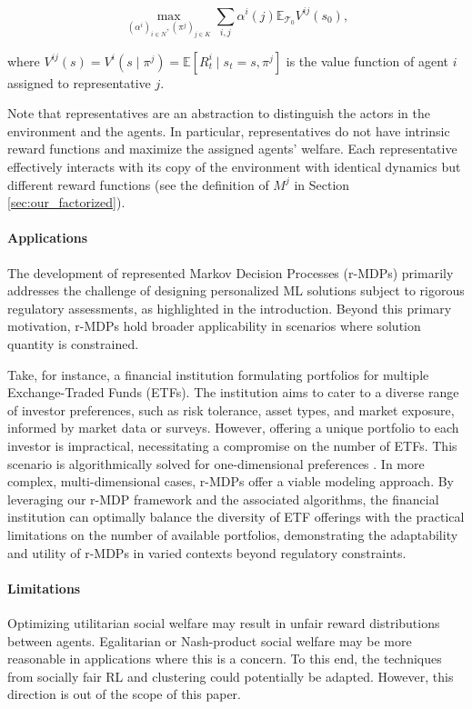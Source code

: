 \documentclass[letterpaper]{article} %
\begin{document}
\begin{equation}\label{eq:objective_joint}
    \max_{(\alpha^i)_{i \in N}, (\pi^{j})_{j \in K}} \sum_{i, j} \alpha^i(j) \mathbb{E}_{\mathcal{T}_0} V^{ij}(s_0),
\end{equation}

\noindent where $V^{ij}(s) = V^i(s \mid \pi^j) = \mathbb{E} [ R_t^i \mid s_t = s, \pi^j ]$ is the value function of agent $i$ assigned to representative $j$.

Note that representatives are an abstraction to distinguish the actors in the environment and the agents. In particular, representatives do not have intrinsic reward functions and maximize the assigned agents' welfare. Each representative effectively interacts with its copy of the environment with identical dynamics but different reward functions (see the definition of $M^j$ in Section \ref{sec:our_factorized}).

\paragraph{Applications} The development of represented Markov Decision Processes (r-MDPs) primarily addresses the challenge of designing personalized ML solutions subject to rigorous regulatory assessments, as highlighted in the introduction. Beyond this primary motivation, r-MDPs hold broader applicability in scenarios where solution quantity is constrained.

Take, for instance, a financial institution formulating portfolios for multiple Exchange-Traded Funds (ETFs). The institution aims to cater to a diverse range of investor preferences, such as risk tolerance, asset types, and market exposure, informed by market data or surveys. However, offering a unique portfolio to each investor is impractical, necessitating a compromise on the number of ETFs. This scenario is algorithmically solved for one-dimensional preferences \cite{diana2021algorithms}. In more complex, multi-dimensional cases, r-MDPs offer a viable modeling approach. By leveraging our r-MDP framework and the associated algorithms, the financial institution can optimally balance the diversity of ETF offerings with the practical limitations on the number of available portfolios, demonstrating the adaptability and utility of r-MDPs in varied contexts beyond regulatory constraints.

\paragraph{Limitations} Optimizing utilitarian social welfare may result in unfair reward distributions between agents. Egalitarian or Nash-product social welfare may be more reasonable in applications where this is a concern. To this end, the techniques from socially fair RL \cite{mandal2022socially} and clustering \cite{kar2023feature} could potentially be adapted. However, this direction is out of the scope of this paper.
\end{document}
